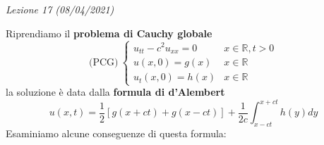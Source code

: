 \documentclass[10pt,a4paper,twoside,openright]{book}
\begin{document}
\textit{Lezione 17 (08/04/2021)}

Riprendiamo il \textbf{problema di Cauchy globale}
\begin{equation}
	\text{(PCG)} \ 
	\begin{cases}
		u_{tt} -c^{2} u_{xx} =0 & x\in \mathbb{R} ,t >0 \\
		u( x,0) =g( x)          & x\in \mathbb{R}       \\
		u_{t}( x,0) =h( x)      & x\in \mathbb{R}       
	\end{cases}
	\label{eq:onde-pcg-1d}
\end{equation}
la soluzione è data dalla \textbf{formula di d'Alembert}
\begin{equation}
	u( x,t) =\frac{1}{2}[ g( x+ct) +g( x-ct)] +\frac{1}{2c}\int _{x-ct}^{x+ct} h( y) dy
	\label{eq:onde-formula-di-dAlembert}
\end{equation}
Esaminiamo alcune conseguenze di questa formula:
\end{document}
